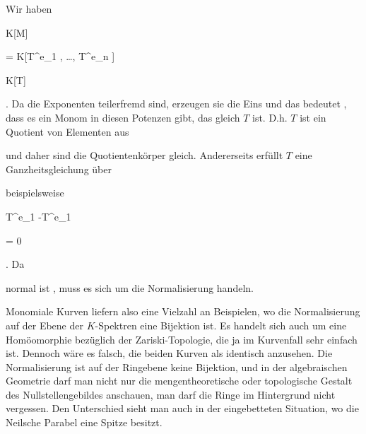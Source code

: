 {


Wir haben


\mavergleichskette

{\vergleichskette

{ K[M]
}

{ = }{ K[T^{e_1 } , \ldots ,  T^{e_n }]
}

{ \subseteq }{ K[T]
}

{    }{
}

{   }{
}

}
{}{}{.}
Da die Exponenten teilerfremd sind, erzeugen sie die Eins und das bedeutet
 {} {,}
dass es ein Monom in diesen Potenzen
 {} {}
gibt, das gleich $T$ ist. D.h. $T$ ist ein Quotient von Elementen aus

 und daher sind die Quotientenkörper gleich. Andererseits erfüllt $T$ eine Ganzheitsgleichung über

 beispielsweise
 {} {}


\mavergleichskette

{\vergleichskette

{ T^{e_1 }-T^{e_1 }
}

{ = }{ 0
}

{  }{
}

{    }{
}

{   }{
}

}
{}{}{.}
Da

 normal ist
 {} {,}
muss es sich um die Normalisierung handeln.


}


Monomiale Kurven liefern also eine Vielzahl an Beispielen, wo die Normalisierung auf der Ebene der $K$-Spektren eine Bijektion ist. Es handelt sich auch um eine Homöomorphie bezüglich der Zariski-Topologie, die ja im Kurvenfall sehr einfach ist. Dennoch wäre es falsch, die beiden Kurven als identisch anzusehen. Die Normalisierung ist
 {} {}
auf der Ringebene keine Bijektion, und in der algebraischen Geometrie darf man nicht nur die mengentheoretische oder topologische Gestalt des Nullstellengebildes anschauen, man darf die Ringe
 {} {}
im Hintergrund nicht vergessen. Den Unterschied sieht man auch in der eingebetteten Situation, wo die Neilsche Parabel eine Spitze besitzt.


